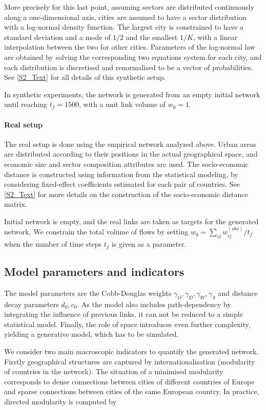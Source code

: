 \documentclass[10pt,letterpaper]{article}
\begin{document}
More precisely for this last point, assuming sectors are distributed continuously along a one-dimensional axis, cities are assumed to have a sector distribution with a log-normal density function. The largest city is constrained to have a standard deviation and a mode of $1/2$ and the smallest $1/K$, with a linear interpolation between the two for other cities. Parameters of the log-normal law are obtained by solving the corresponding two equations system for each city, and each distribution is discretised and renormalised to be a vector of probabilities. See \ref{S2_Text} for all details of this synthetic setup.

In synthetic experiments, the network is generated from an empty initial network until reaching $t_f=1500$, with a unit link volume of $w_0 = 1$.

     
\paragraph{Real setup}

The real setup is done using the empirical network analyzed above. Urban areas are distributed according to their positions in the actual geographical space, and economic size and sector composition attributes are used. The socio-economic distance is constructed using information from the statistical modeling, by considering fixed-effect coefficients estimated for each pair of countries. See \ref{S2_Text} for more details on the construction of the socio-economic distance matrix.

Initial network is empty, and the real links are taken as targets for the generated network. We constrain the total volume of flows by setting $w_0 = \sum_{ij} w_{ij}^{(obs)} / t_{f}$ when the number of time steps $t_f$ is given as a parameter.


\subsection*{Model parameters and indicators}

The model parameters are the Cobb-Douglas weights $\gamma_O,\gamma_D,\gamma_W,\gamma_S$ and distance decay parameters $d_0,c_0$. As the model also includes path-dependency by integrating the influence of previous links, it can not be reduced to a simple statistical model. Finally, the role of space introduces even further complexity, yielding a generative model, which has to be simulated.

We consider two main macroscopic indicators to quantify the generated network. Firstly geographical structures are captured by internationalisation (modularity of countries in the network). The situation of a minimised modularity corresponds to dense connections between cities of different countries of Europe and sparse connections between cities of the same European country. In practice, directed modularity is computed by
\begin{equation}
    
\end{equation}
\end{document}
